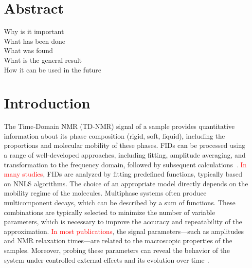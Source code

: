 \documentclass[a4paper,12pt]{article}
\begin{document}
\maketitle %
\section*{Abstract}

Why is it important\\
What has been done\\
What was found\\
What is the general result\\
How it can be used in the future\\

\newpage
\section{Introduction}\label{sec:Introduction}

The Time-Domain NMR (TD-NMR) signal of a sample provides quantitative information about its phase composition (rigid, soft, liquid), including the proportions and molecular mobility of these phases. 
FIDs can be processed using a range of well-developed approaches, including fitting, amplitude averaging, and transformation to the frequency domain, followed by subsequent calculations~\cite{Grunin2023}. 
\textcolor{red}{In many studies}, FIDs are analyzed by fitting predefined functions, typically based on NNLS algorithms. 
The choice of an appropriate model directly depends on the mobility regime of the molecules. 
Multiphase systems often produce multicomponent decays, which can be described by a sum of functions. 
These combinations are typically selected to minimize the number of variable parameters, which is necessary to improve the accuracy and repeatability of the approximation. 
\textcolor{red}{In most publications}, the signal parameters—such as amplitudes and NMR relaxation times—are related to the macroscopic properties of the samples. 
Moreover, probing these parameters can reveal the behavior of the system under controlled external effects and its evolution over time~\cite{vanRooyen2024}.
\end{document}
